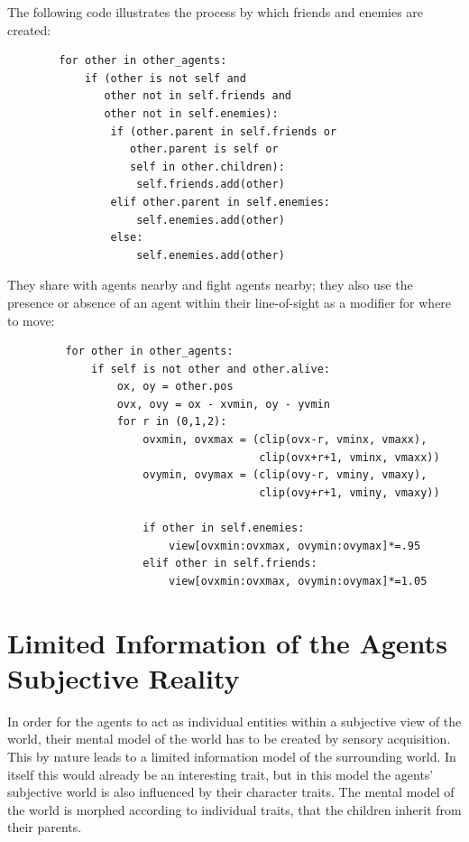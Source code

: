 \noindent
The following code illustrates the process by which friends and enemies are created:
\begin{verbatim}
        for other in other_agents:
            if (other is not self and
               other not in self.friends and
               other not in self.enemies):
                if (other.parent in self.friends or
                   other.parent is self or
                   self in other.children):
                    self.friends.add(other)
                elif other.parent in self.enemies:
                    self.enemies.add(other)
                else:
                    self.enemies.add(other)      
\end{verbatim}
\noindent
They share with agents nearby and fight agents nearby; they also use the presence or absence of an agent within their line-of-sight as a modifier for where to move:
\begin{verbatim}
         for other in other_agents:
             if self is not other and other.alive:
                 ox, oy = other.pos
                 ovx, ovy = ox - xvmin, oy - yvmin
                 for r in (0,1,2):
                     ovxmin, ovxmax = (clip(ovx-r, vminx, vmaxx), 
                                       clip(ovx+r+1, vminx, vmaxx))
                     ovymin, ovymax = (clip(ovy-r, vminy, vmaxy),
                                       clip(ovy+r+1, vminy, vmaxy))

                     if other in self.enemies:
                         view[ovxmin:ovxmax, ovymin:ovymax]*=.95
                     elif other in self.friends:
                         view[ovxmin:ovxmax, ovymin:ovymax]*=1.05
\end{verbatim}
 
\section{Limited Information of the Agents Subjective Reality}
In order for the agents to act as individual entities within a subjective view of the world, their mental model of the world has to be created by sensory acquisition. This by nature leads to a limited information model of the surrounding world. In itself this would already be an interesting trait, but in this model the agents' subjective world is also influenced by their character traits. The mental model of the world is morphed according to individual traits, that the children inherit from their parents.

